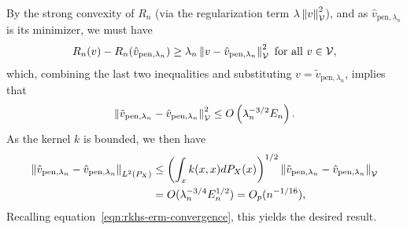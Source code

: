 By the strong convexity of $R_n$
(via the regularization term $\lambda \left\|{v}\right\|_{\mathcal{V}}^2$),
and as $\hat v_{\text{pen}, \lambda_n}$ is its minimizer, we must have 
\begin{align*}
R_n(v) - R_n(\hat v_{\text{pen}, \lambda_n}) \ge \lambda_n \left\|{v - \hat v_{\text{pen}, \lambda_n}}\right\|_{\mathcal{V}}^2 \text{ for all } v\in \mathcal{V},
\end{align*}
which, combining the last two inequalities and
substituting $v = \tilde{v}_{\text{pen},\lambda_n}$, implies that
\begin{align*}
\left\|{\tilde{v}_{\text{pen}, \lambda_n} - \hat v_{\text{pen}, \lambda_n}}\right\|_{\mathcal{V}}^2 \le O\left(\lambda_n^{-3/2} E_n \right).
\end{align*}
As the kernel $k$ is bounded, we then have
\begin{align*}
\left\|{\tilde{v}_{\text{pen}, \lambda_n} - \hat v_{\text{pen}, \lambda_n}}\right\|_{L^2(P_X)} &\le \left(\int_{x} k(x,x)dP_X(x)\right)^{1/2} \left\|{\tilde{v}_{\text{pen}, \lambda_n} - \hat v_{\text{pen}, \lambda_n}}\right\|_{\mathcal{V}} \\
&= O(\lambda_n^{-3/4} E_n^{1/2}) = O_p(n^{- 1/16}),
\end{align*}
Recalling equation~\eqref{eqn:rkhs-erm-convergence}, this yields the desired result.

